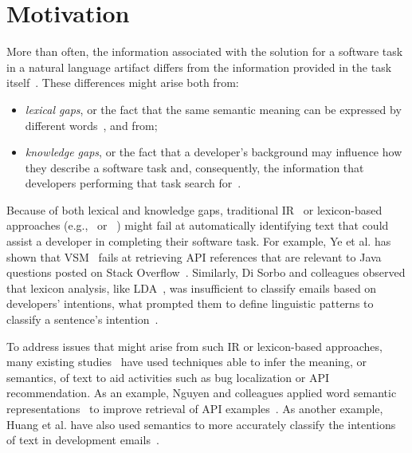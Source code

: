 \section{Motivation}
\label{cp5:motivation}




More than often, the information associated 
with the solution for a software task in a natural language artifact differs from the information provided in the task itself~\cite{silva2019, Ye2016}.
These differences might arise both from:

\begin{itemize}
    \item \textit{lexical gaps}, or the fact that the same semantic meaning can be expressed by different words~\cite{Huang2018}, and from;
    \item \textit{knowledge gaps},
    or the fact that a developer's background may 
    influence how they describe a software task and, consequently,
    the information that developers performing that task search for~\cite{Kevic2014}.
\end{itemize}





Because of both lexical and knowledge gaps, traditional \acf{IR}~\cite{Manning2009IR} or lexicon-based approaches (e.g.,~\cite{Ponzanelli2015} or ~\cite{Xu2017}) might fail at automatically identifying text that could assist a developer in completing their software task. 
For example, Ye et al. has shown that \acf{VSM}~\cite{salton1975vector} 
 fails at retrieving API references that are relevant to Java questions
posted on Stack Overflow~\cite{Ye2016}.
Similarly,
Di Sorbo and colleagues observed that lexicon analysis, like \acs{LDA}~\cite{blei2003latent}, was insufficient to classify 
emails based on developers' intentions,
what prompted them to define linguistic patterns to classify a sentence's intention~\cite{Sorbo2015}.



To address issues that might arise from such \acs{IR} or lexicon-based approaches, many existing studies~\cite{silva2019, Huang2018, Ye2016, huang2018automating} have used 
techniques able to infer the
meaning, or semantics, of text to aid activities such as bug localization or API recommendation. As an example, Nguyen and colleagues applied word semantic representations~\cite{Mikolov2013space} to improve  retrieval of API examples~\cite{nguyen2017}.
As another example, Huang et al. have also used semantics 
to more accurately classify the intentions of text in development emails~\cite{huang2018automating}.



